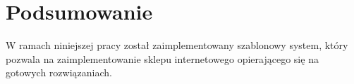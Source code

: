 \chapter{Podsumowanie}
\thispagestyle{chapterBeginStyle}

W ramach niniejszej pracy został zaimplementowany szablonowy system, który pozwala na zaimplementowanie sklepu internetowego opierającego się na gotowych rozwiązaniach.




